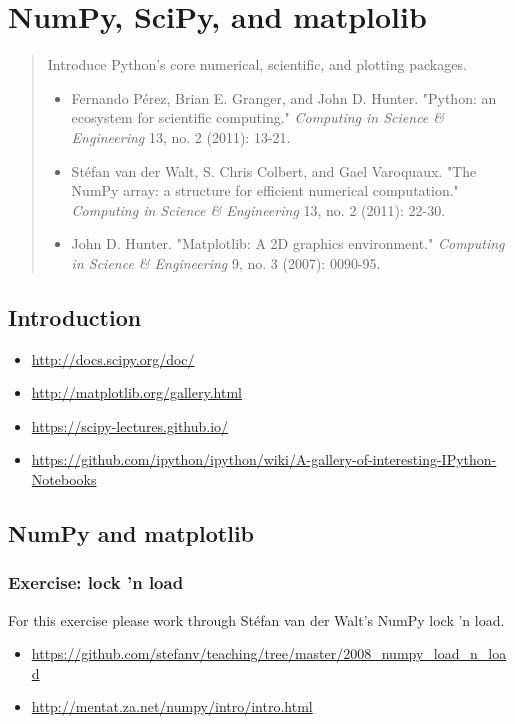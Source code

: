\chapter{NumPy, SciPy, and matplolib}

\begin{abstract}
Introduce Python's core numerical, scientific, and plotting packages.

\begin{itemize}
\item Fernando Pérez, Brian E. Granger, and John D. Hunter. "Python: an ecosystem for
scientific computing." \emph{Computing in Science \& Engineering} 13, no. 2 (2011):
13-21.
\item Stéfan van der Walt, S. Chris Colbert, and Gael Varoquaux. "The NumPy array: a
structure for efficient numerical computation." \emph{Computing in Science \&
Engineering} 13, no. 2 (2011): 22-30.
\item John D. Hunter. "Matplotlib: A 2D graphics environment." \emph{Computing
in Science \& Engineering} 9, no. 3 (2007): 0090-95.
\end{itemize}
\end{abstract}

\section{Introduction}
\begin{itemize}
\item \url{http://docs.scipy.org/doc/}
\item \url{http://matplotlib.org/gallery.html}
\item \url{https://scipy-lectures.github.io/}
\item \url{https://github.com/ipython/ipython/wiki/A-gallery-of-interesting-IPython-Notebooks}
\end{itemize}

\section{NumPy and matplotlib}

\subsection{Exercise: lock 'n load}
For this exercise please work through Stéfan van der Walt's NumPy
lock 'n load.

\begin{itemize}
\item \url{https://github.com/stefanv/teaching/tree/master/2008_numpy_load_n_load}
\item \url{http://mentat.za.net/numpy/intro/intro.html}
\end{itemize}

